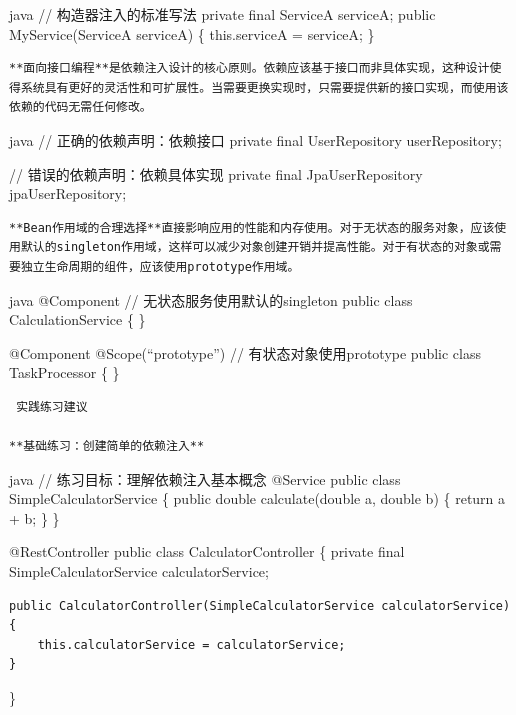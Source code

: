 java // 构造器注入的标准写法 private final ServiceA serviceA; public MyService(ServiceA serviceA) \{ this.serviceA = serviceA; \}

\begin{lstlisting}
**面向接口编程**是依赖注入设计的核心原则。依赖应该基于接口而非具体实现，这种设计使得系统具有更好的灵活性和可扩展性。当需要更换实现时，只需要提供新的接口实现，而使用该依赖的代码无需任何修改。
\end{lstlisting}

java // 正确的依赖声明：依赖接口 private final UserRepository userRepository;

// 错误的依赖声明：依赖具体实现 private final JpaUserRepository jpaUserRepository;

\begin{lstlisting}
**Bean作用域的合理选择**直接影响应用的性能和内存使用。对于无状态的服务对象，应该使用默认的singleton作用域，这样可以减少对象创建开销并提高性能。对于有状态的对象或需要独立生命周期的组件，应该使用prototype作用域。
\end{lstlisting}

java @Component // 无状态服务使用默认的singleton public class CalculationService \{ \}

@Component @Scope(``prototype'') // 有状态对象使用prototype public class TaskProcessor \{ \}

\begin{lstlisting}
 实践练习建议

**基础练习：创建简单的依赖注入**
\end{lstlisting}

java // 练习目标：理解依赖注入基本概念 @Service public class SimpleCalculatorService \{ public double calculate(double a, double b) \{ return a + b; \} \}

@RestController public class CalculatorController \{ private final SimpleCalculatorService calculatorService;

\begin{verbatim}
public CalculatorController(SimpleCalculatorService calculatorService) {
    this.calculatorService = calculatorService;
}
\end{verbatim}

\}

